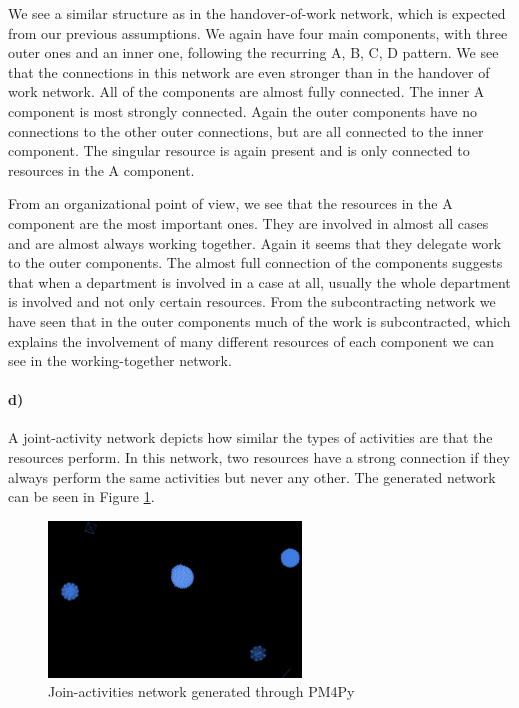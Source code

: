 \documentclass[12pt]{report}
\begin{document}
We see a similar structure as in the handover-of-work network, which is expected from our previous assumptions. We again have four main components, with three outer ones and an inner one, following the recurring A, B, C, D pattern. We see that the connections in this network are even stronger than in the handover of work network. All of the components are almost fully connected. The inner A component is most strongly connected. Again the outer components have no connections to the other outer connections, but are all connected to the inner component. The singular resource is again present and is only connected to resources in the A component.

From an organizational point of view, we see that the resources in the A component are the most important ones. They are involved in almost all cases and are almost always working together. Again it seems that they delegate work to the outer components. The almost full connection of the components suggests that when a department is involved in a case at all, usually the whole department is involved and not only certain resources. From the subcontracting network we have seen that in the outer components much of the work is subcontracted, which explains the involvement of many different resources of each component we can see in the working-together network.

\paragraph{d)} 

A joint-activity network depicts how similar the types of activities are that the resources perform. In this network, two resources have a strong connection if they always perform the same activities but never any other. The generated network can be seen in Figure \ref{fig:figures-q2_jointactivities-png}.

\begin{figure}[h]
    \centering
    \includegraphics[width=0.6\textwidth]{figures/q2_jointactivities.png}
    \caption{Join-activities network generated through PM4Py}
    \label{fig:figures-q2_jointactivities-png}
\end{figure}
\end{document}
